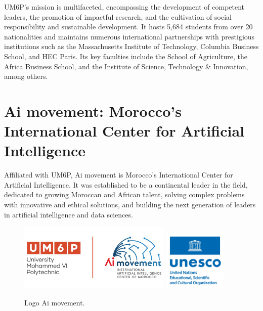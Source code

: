 \documentclass[../Main.tex]{subfiles}
\begin{document}
UM6P's mission is multifaceted, encompassing the development of competent leaders, the promotion of impactful research, and the cultivation of social responsibility and sustainable development. It hosts 5,684 students from over 20 nationalities and maintains numerous international partnerships with prestigious institutions such as the Massachusetts Institute of Technology, Columbia Business School, and HEC Paris. Its key faculties include the School of Agriculture, the Africa Business School, and the Institute of Science, Technology \& Innovation, among others.

\section{Ai movement: Morocco's International Center for Artificial Intelligence}
Affiliated with UM6P, Ai movement is Morocco’s International Center for Artificial Intelligence. It was established to be a continental leader in the field, dedicated to growing Moroccan and African talent, solving complex problems with innovative and ethical solutions, and building the next generation of leaders in artificial intelligence and data sciences.

\begin{figure}[H]
    \centering
    \includegraphics[width=0.65\textwidth]{img/logo/aim-um6p.jpeg}
    \includegraphics[width=0.27\textwidth]{img/logo/unesco.jpeg}
    \caption{Logo Ai movement.}
\end{figure}
\end{document}

